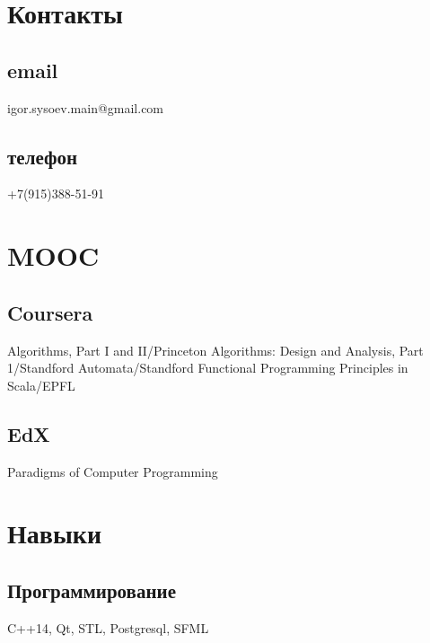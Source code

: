\documentclass[a4paper]{curricula-vitae}
\begin{document}




\begin{minipage}[t]{0.33\textwidth} %

\section{Контакты} 
\subsection{email}
igor.sysoev.main@gmail.com
\subsection{телефон}
+7(915)388-51-91

\section{MOOC}
\subsection{Coursera}
Algorithms, Part I and II/Princeton
Algorithms: Design and Analysis, Part 1/Standford
Automata/Standford
Functional Programming Principles in Scala/EPFL

\subsection{EdX}
Paradigms of Computer Programming

\section{Навыки}

\subsection{Программирование}
C++14, Qt, STL,
Postgresql, SFML


\end{minipage}
\end{document}
